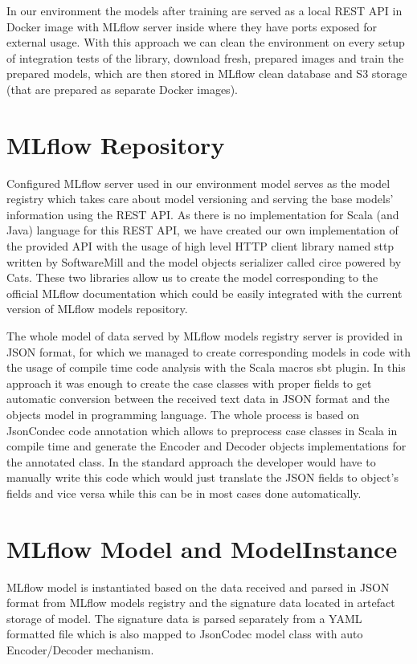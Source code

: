 In our environment the models after training are served as a local REST API in Docker image with MLflow
server inside where they have ports exposed for external usage. With this approach we can clean the
environment on every setup of integration tests of the library, download fresh, prepared images and
train the prepared models, which are then stored in MLflow clean database and S3 storage (that are
prepared as separate Docker images).

\section{MLflow Repository}

Configured MLflow server used in our environment model serves as the model registry which takes care
about model versioning and serving the base models' information using the REST API. As there is no
implementation for Scala (and Java) language for this REST API, we have created our own implementation
of the provided API with the usage of high level HTTP client library named sttp written by SoftwareMill
and the model objects serializer called circe powered by Cats. These two libraries allow us to create
the model corresponding to the official MLflow documentation which could be easily integrated with the
current version of MLflow models repository.

The whole model of data served by MLflow models registry server is provided in JSON format, for which
we managed to create corresponding models in code with the usage of compile time code analysis with
the Scala macros sbt plugin. In this approach it was enough to create the case classes with proper
fields to get automatic conversion between the received text data in JSON format and the objects
model in programming language. The whole process is based on JsonCondec code annotation which allows
to preprocess case classes in Scala in compile time and generate the Encoder and Decoder objects
implementations for the annotated class. In the standard approach the developer would have to manually
write this code which would just translate the JSON fields to object’s fields and vice versa while
this can be in most cases done automatically.

\section{MLflow Model and ModelInstance}

MLflow model is instantiated based on the data received and parsed in JSON format from MLflow models
registry and the signature data located in artefact storage of model. The signature data is parsed
separately from a YAML formatted file which is also mapped to JsonCodec model class with auto Encoder/Decoder
mechanism.

